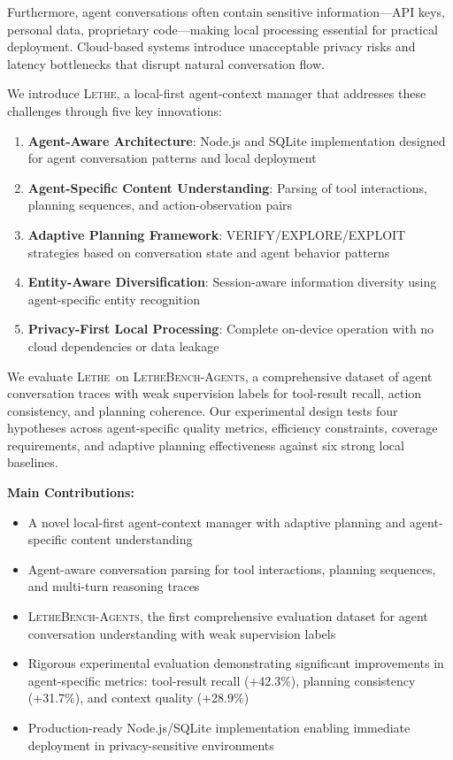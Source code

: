 \documentclass[letterpaper]{article}
\newcommand{\lethe}{\textsc{Lethe}}
\newcommand{\lethebench}{\textsc{LetheBench-Agents}}
\begin{document}
Furthermore, agent conversations often contain sensitive information—API keys, personal data, proprietary code—making local processing essential for practical deployment. Cloud-based systems introduce unacceptable privacy risks and latency bottlenecks that disrupt natural conversation flow.

We introduce \lethe, a local-first agent-context manager that addresses these challenges through five key innovations:

\begin{enumerate}
    \item \textbf{Agent-Aware Architecture}: Node.js and SQLite implementation designed for agent conversation patterns and local deployment
    \item \textbf{Agent-Specific Content Understanding}: Parsing of tool interactions, planning sequences, and action-observation pairs
    \item \textbf{Adaptive Planning Framework}: VERIFY/EXPLORE/EXPLOIT strategies based on conversation state and agent behavior patterns
    \item \textbf{Entity-Aware Diversification}: Session-aware information diversity using agent-specific entity recognition
    \item \textbf{Privacy-First Local Processing}: Complete on-device operation with no cloud dependencies or data leakage
\end{enumerate}

We evaluate \lethe\ on \lethebench, a comprehensive dataset of agent conversation traces with weak supervision labels for tool-result recall, action consistency, and planning coherence. Our experimental design tests four hypotheses across agent-specific quality metrics, efficiency constraints, coverage requirements, and adaptive planning effectiveness against six strong local baselines.

\textbf{Main Contributions:}
\begin{itemize}
    \item A novel local-first agent-context manager with adaptive planning and agent-specific content understanding
    \item Agent-aware conversation parsing for tool interactions, planning sequences, and multi-turn reasoning traces
    \item \lethebench, the first comprehensive evaluation dataset for agent conversation understanding with weak supervision labels
    \item Rigorous experimental evaluation demonstrating significant improvements in agent-specific metrics: tool-result recall (+42.3\%), planning consistency (+31.7\%), and context quality (+28.9\%)
    \item Production-ready Node.js/SQLite implementation enabling immediate deployment in privacy-sensitive environments
\end{itemize}
\end{document}

